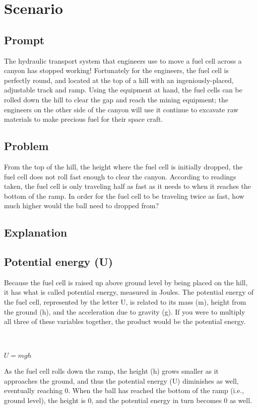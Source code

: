 \documentclass[10pt]{scrartcl}
\renewcommand{\centerline}[1]{
    \\[1em]
    #1
    \\[1em]
}
\begin{document}
\section{Scenario}  
\subsection{Prompt}
The hydraulic transport system that engineers use to move a fuel cell across a canyon has stopped working!  Fortunately for the engineers, the fuel cell is perfectly round, and located at the top of a hill with an ingeniously-placed, adjustable track and ramp. Using the equipment at hand, the fuel cells can be rolled down the hill to clear the gap and reach the mining equipment; the engineers on the other side of the canyon will use it continue to excavate raw materials to make precious fuel for their space craft.

\subsection{Problem}
From the top of the hill, the height where the fuel cell is initially dropped, the fuel cell does not roll fast enough to clear the canyon. According to readings taken, the fuel cell is only traveling half as fast as it needs to when it reaches the bottom of the ramp.
In order for the fuel cell to be traveling twice as fast, how much higher would the ball need to dropped from?

\subsection{Explanation}
\subsection{Potential energy (U)}

Because the fuel cell is raised up above ground level by being placed on the hill, it has what is called potential energy, measured in Joules. The potential energy of the fuel cell, represented by the letter U, is related to its mass (m), height from the ground (h), and the acceleration due to gravity (g). If you were to multiply all three of these variables together, the product would be the potential energy.

\centerline{}

$U = mgh$

As the fuel cell rolls down the ramp, the height (h) grows smaller as it approaches the ground, and thus the potential energy (U) diminishes as well, eventually reaching 0. When the ball has reached the bottom of the ramp (i.e., ground level), the height is 0, and the potential energy in turn becomes 0 as well.
\end{document}
